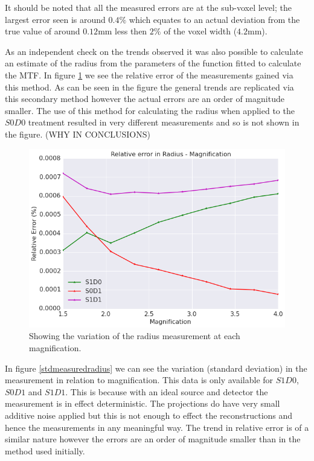 \documentclass[
  twoside,
  11pt, a4paper,
  footinclude=true,
  headinclude=true,
  cleardoublepage=empty
]{scrbook}
\begin{document}
It should be noted that all the measured errors are at the sub-voxel level; the largest error seen is around $0.4\%$ which equates to an actual deviation from the true value of around $0.12$mm less then $2\%$ of the voxel width ($4.2$mm).

As an independent check on the trends observed it was also possible to calculate an estimate of the radius from the parameters of the function fitted to calculate the MTF. In figure \ref{mtfradius} we see the relative error of the measurements gained via this method. As can be seen in the figure the general trends  are replicated via this secondary method however the actual errors are an order of magnitude smaller. The use of this method for calculating the radius when applied to the $S0D0$ treatment resulted in very different measurements and so is not shown in the figure. (WHY IN CONCLUSIONS)

\begin{figure}[h!]
  \centering
    \includegraphics[width=\textwidth]{figures/output_35_0.png}
    \caption{Showing the variation of the radius measurement at each magnification.}
        \label{mtfradius}
\end{figure}

In figure \ref{stdmeasuredradius} we can see the variation (standard deviation) in the measurement in relation to magnification. This data is only available for $S1D0$, $S0D1$ and $S1D1$. This is because with an ideal source and detector the measurement is in effect deterministic. The projections do have very small additive noise applied but this is not enough to effect the reconstructions and hence the measurements in any meaningful way. The trend in relative error is of a similar nature however the errors are an order of magnitude smaller than in the method used initially.
\end{document}

